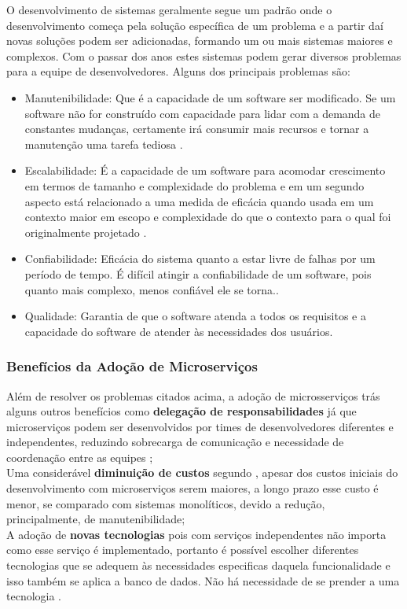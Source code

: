 \documentclass[12pt]{article}
\begin{document}
O desenvolvimento de sistemas geralmente segue um padrão onde o desenvolvimento começa pela solução específica de um problema e a partir daí novas soluções podem ser adicionadas, formando um ou mais sistemas maiores e complexos. Com o passar dos anos estes sistemas podem gerar diversos problemas para a equipe de desenvolvedores. Alguns dos principais problemas são:
\begin{itemize}
	\item Manutenibilidade: Que é a capacidade de um software ser modificado. Se um software não for construído com capacidade para lidar com a demanda de constantes mudanças, certamente irá consumir mais recursos e tornar a manutenção uma tarefa tediosa \cite{Velmourougan2014}.
	\item Escalabilidade: É a capacidade de um software para acomodar crescimento em termos de tamanho e complexidade do problema e em um segundo aspecto está relacionado a uma medida de eficácia quando usada em um contexto maior em escopo e complexidade do que o contexto para o qual foi originalmente projetado \cite{Ibrahim2009}.
	\item Confiabilidade: Eficácia do sistema quanto a estar livre de falhas por um período de tempo. É difícil atingir a confiabilidade de um software, pois quanto mais complexo, menos confiável ele se torna.\cite{pan1999}.
	\item Qualidade: Garantia de que o software atenda a todos os requisitos e a capacidade do software de atender às necessidades dos usuários.
\end{itemize}


\subsubsection{Benefícios da Adoção de Microserviços}
Além de resolver os problemas citados acima, a adoção de microsserviços trás alguns outros benefícios como \textbf{delegação de responsabilidades} já que microserviços podem ser desenvolvidos por times de desenvolvedores diferentes e independentes, reduzindo sobrecarga de comunicação e necessidade de coordenação entre as equipes \cite{Taibi}; 
\\
Uma considerável \textbf{diminuição de custos} segundo \cite{Taibi}, apesar dos custos iniciais do desenvolvimento com microserviços serem maiores, a longo prazo esse custo é menor, se comparado com sistemas monolíticos, devido a redução, principalmente, de manutenibilidade; 
\\
A adoção de \textbf{novas tecnologias} pois com serviços independentes não importa como esse serviço é implementado, portanto é possível escolher diferentes tecnologias que se adequem às necessidades especificas daquela funcionalidade e isso também se aplica a banco de dados. Não há necessidade de se prender a uma tecnologia \cite{Richter2017a}. 
\end{document}
